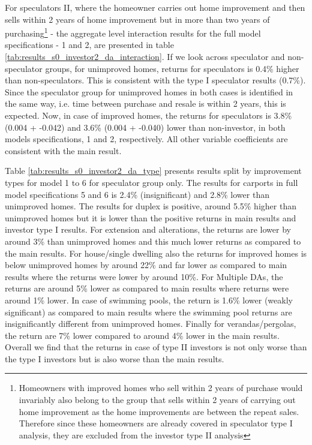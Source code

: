 \documentclass[AEJ,reqno, draftmode]{AEA} %
\begin{document}
For speculators II, where the homeowner carries out home improvement and then sells within 2 years of home improvement but in more than two years of purchasing\footnote{Homeowners with improved homes who sell within 2 years of purchase would invariably also belong to the group that sells within 2 years of carrying out home improvement as the home improvements are between the repeat sales. Therefore since these homeowners are already covered in speculator type I analysis, they are excluded from the investor type II analysis} - the aggregate level interaction results for the full model specifications - 1 and 2, are presented in table \ref{tab:results_s0_investor2_da_interaction}. 
If we look across speculator and non-speculator groups, for unimproved homes, returns for speculators is 0.4\% higher than non-speculators. This is consistent with the type I speculator results (0.7\%). Since the speculator group for unimproved homes in both cases is identified in the same way, i.e. time between purchase and resale is within 2 years, this is expected. Now, in case of improved homes, the returns for speculators is 3.8\% (0.004 + -0.042) and 3.6\% (0.004 + -0.040) lower than non-investor, in both models specifications, 1 and 2, respectively. All other variable coefficients are consistent with the main result.


\restoregeometry

Table \ref{tab:results_s0_investor2_da_type} presents results split by improvement types for model 1 to 6 for speculator group only. The results for carports in full model specifications 5 and 6 is 2.4\% (insignificant) and 2.8\% lower than unimproved homes. The results for duplex is positive, around 5.5\% higher than unimproved homes but it is lower than the positive returns in main results and investor type I results. For extension and alterations, the returns are lower by around 3\% than unimproved homes and this much lower returns as compared to the main results. For house/single dwelling also the returns for improved homes is below unimproved homes by around 22\% and far lower as compared to main results where the returns were lower by around 10\%. For Multiple DAs, the returns are around 5\% lower as compared to main results where returns were around 1\% lower. In case of swimming pools, the return is 1.6\% lower (weakly significant) as compared to main results where the swimming pool returns are insignificantly different from unimproved homes. Finally for verandas/pergolas, the return are 7\% lower compared to around 4\% lower in the main results. Overall we find that the returns in case of type II investors is not only worse than the type I investors but is also worse than the main results. 
\end{document}
